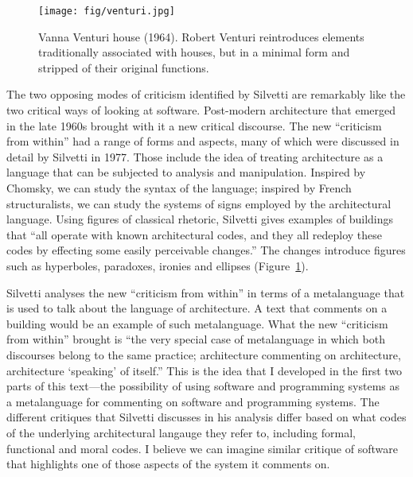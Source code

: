 \begin{figure}
\centering
\vspace{-1em}
\texttt{[image: fig/venturi.jpg]}
\caption{Vanna Venturi house (1964). Robert Venturi reintroduces elements traditionally associated
with houses, but in a minimal form and stripped of their original functions.}
\label{fig:vanna}
\end{figure}

The two opposing modes of criticism identified by Silvetti are remarkably like the two critical
ways of looking at software. Post-modern architecture that emerged in the late 1960s brought with
it a new critical discourse. The new ``criticism from within'' had a range of forms and
aspects, many of which were discussed in detail by Silvetti in 1977. Those include the idea of
treating architecture as a language that can be subjected to analysis and manipulation.
Inspired by Chomsky, we can study the syntax of the language; inspired by French structuralists,
we can study the systems of signs employed by the architectural language.
Using figures of classical rhetoric, Silvetti gives examples of buildings that ``all operate
with known architectural codes, and they all redeploy these codes by effecting some easily
perceivable changes.'' The changes introduce figures such as hyperboles,
paradoxes, ironies and ellipses (Figure~\ref{fig:vanna}).

Silvetti analyses the new ``criticism from within'' in terms of a metalanguage that is
used to talk about the language of architecture. A text that comments on a building would be
an example of such metalanguage. What the new ``criticism from within'' brought is
``the very special case of metalanguage in which both discourses belong to the same practice;
architecture commenting on architecture, architecture `speaking' of itself.''
This is the idea that I developed in the first two parts of this text---the possibility of
using software and programming systems as a metalanguage for commenting on software and
programming systems. The different critiques that Silvetti discusses in his analysis differ
based on what codes of the underlying architectural langauge they refer to, including
formal, functional and moral codes. I believe we can imagine similar critique of software
that highlights one of those aspects of the system it comments on.


